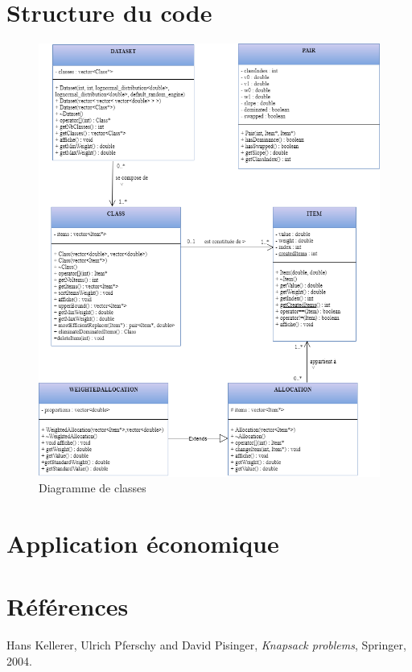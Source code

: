 \documentclass{article}
\begin{document}
\section{Structure du code}

\begin{figure}[!ht]
	\centering
	\includegraphics[width=14cm]{KnapsackClasses.png}
	\caption{Diagramme de classes}
	\label{fig:diagramme}
\end{figure}

\section{Application économique}

\section{Références}

\begin{thebibliography}{9}
  Hans Kellerer, Ulrich Pferschy and David Pisinger,
  \textit{Knapsack problems},
  Springer,
  2004.
\end{thebibliography}
\end{document}
